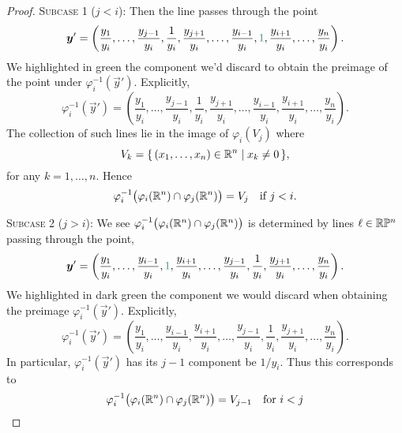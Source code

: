 \begin{proof}
\textsc{Subcase 1 ($j<i$):}
Then the line passes through the point
\begin{equation}
\vec{y}' = \left(\frac{y_{1}}{y_{i}}, \dots, \frac{y_{j-1}}{y_{i}}, \frac{1}{y_{i}},
\frac{y_{j+1}}{y_{i}}, \dots, \frac{y_{i-1}}{y_{i}}, {\color{ForestGreen}1},
\frac{y_{i+1}}{y_{i}}, \dots, \frac{y_{n}}{y_{i}}\right).
\end{equation}
We highlighted in green the component we'd discard to obtain the
preimage of the point under $\varphi_{i}^{-1}(\vec{y}')$. Explicitly,
\begin{equation}
\varphi_{i}^{-1}(\vec{y}') = \left(\frac{y_{1}}{y_{i}}, \dots, \frac{y_{j-1}}{y_{i}}, \frac{1}{y_{i}},
\frac{y_{j+1}}{y_{i}}, \dots, \frac{y_{i-1}}{y_{i}},
\frac{y_{i+1}}{y_{i}}, \dots, \frac{y_{n}}{y_{i}}\right).
\end{equation}
The collection of such lines lie in the image of
$\varphi_{i}(V_{j})$ where %
\begin{equation}
V_{k} = \{\,(x_{1},\dots,x_{n})\in\mathbb{R}^{n}\mid x_{k}\neq 0\,\},
\end{equation}
for any $k=1,\dots,n$.
Hence
\begin{equation}\label{eq:pf:projective-space-is-manifold:chart-compatibility:preimage1}
\varphi_{i}^{-1}\bigl(\varphi_{i}(\mathbb{R}^{n})\cap\varphi_{j}(\mathbb{R}^{n})\bigr)=V_{j}\quad\mbox{if }
j < i.
\end{equation}

\textsc{Subcase 2 ($j>i$):}
We see $\varphi_{i}^{-1}\bigl(\varphi_{i}(\mathbb{R}^{n})\cap\varphi_{j}(\mathbb{R}^{n})\bigr)$
is determined by lines $\ell\in\mathbb{R}\mathbb{P}^{n}$ passing through the point,
\begin{equation}
  \vec{y}' = \left(\frac{y_{1}}{y_{i}},
  \dots,
  \frac{y_{i-1}}{y_{i}}, {\color{ForestGreen}1}, \frac{y_{i+1}}{y_{i}},
  \dots,
  \frac{y_{j-1}}{y_{i}}, \frac{1}{y_{i}}, \frac{y_{j+1}}{y_{i}},
  \dots,
  \frac{y_{n}}{y_{i}}\right).
\end{equation}
We highlighted in dark green the component we would discard when
obtaining the preimage $\varphi_{i}^{-1}(\vec{y}')$. Explicitly,
\begin{equation}
\varphi_{i}^{-1}(\vec{y}') = \left(\frac{y_{1}}{y_{i}},
  \dots,
  \frac{y_{i-1}}{y_{i}}, \frac{y_{i+1}}{y_{i}},
  \dots,
  \frac{y_{j-1}}{y_{i}}, \frac{1}{y_{i}}, \frac{y_{j+1}}{y_{i}},
  \dots,
  \frac{y_{n}}{y_{i}}\right).
\end{equation}
In particular, $\varphi_{i}^{-1}(\vec{y}')$ has its $j-1$ component be $1/y_{i}$.
Thus this corresponds to
\begin{equation}\label{eq:pf:projective-space-is-manifold:chart-compatibility:preimage2}
\varphi_{i}^{-1}\bigl(\varphi_{i}(\mathbb{R}^{n})\cap\varphi_{j}(\mathbb{R}^{n})\bigr)=V_{j-1}
  \quad\mbox{for } i<j
\end{equation}


\end{proof}
